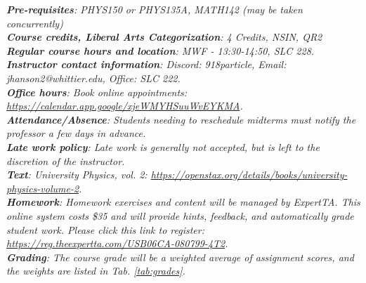 \documentclass[10pt]{article}
\begin{document}
\maketitle

\begin{abstract}
The concepts of calculus-based electromagnetism will be presented within the context of interactive problem-solving.  The course will begin with the concepts of electric charge, electrostatics, electric potential, and capacitance.  Next, current and DC circuits will be covered.  Magnetostatics and magnetic induction follow DC circuits, concluding with AC circuits.  Finally, seleted topics in electromagnetic waves and optics will be presented.  The course work will include interactive computational exercises, analytic textbook problems, group-designed projects, and lab-based activities.
\end{abstract}
\noindent
\textit{\textbf{Pre-requisites}: PHYS150 or PHYS135A, MATH142 (may be taken concurrently)} \\
\textit{\textbf{Course credits, Liberal Arts Categorization}: 4 Credits, NSIN, QR2} \\
\textit{\textbf{Regular course hours and location}: MWF - 13:30-14:50, SLC 228.} \\
\textit{\textbf{Instructor contact information}: Discord: 918particle, Email: jhanson2@whittier.edu, Office: SLC 222.} \\
\noindent
\textit{\textbf{Office hours}: Book online appointments: \url{https://calendar.app.google/xjeWMYHSuuWvEYKMA}.} \\
\textit{\textbf{Attendance/Absence}: Students needing to reschedule midterms must notify the professor a few days in advance.} \\ 
\textit{\textbf{Late work policy}: Late work is generally not accepted, but is left to the discretion of the instructor.} \\
\textit{\textbf{Text}: University Physics, vol. 2: \url{https://openstax.org/details/books/university-physics-volume-2}.} \\
\textit{\textbf{Homework}: Homework exercises and content will be managed by ExpertTA.  This online system costs \$35 and will provide hints, feedback, and automatically grade student work.  Please click this link to register: \url{https://reg.theexpertta.com/USB06CA-080799-4T2}.} \\
\textit{\textbf{Grading}: The course grade will be a weighted average of assignment scores, and the weights are listed in Tab. \ref{tab:grades}.}
\end{document}
